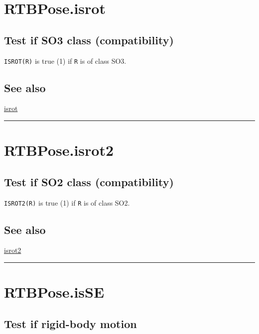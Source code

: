 \hypertarget{RTBPose.isrot}{\section*{RTBPose.isrot}}
\subsection*{Test if SO3 class (compatibility)}


\texttt{ISROT(R)} is true (1) if \texttt{R} is of class SO3.


\subsection*{See also}


\hyperlink{isrot}{\color{blue} isrot}

\vspace{1.5ex}\hrule

\hypertarget{RTBPose.isrot2}{\section*{RTBPose.isrot2}}
\subsection*{Test if SO2 class (compatibility)}


\texttt{ISROT2(R)} is true (1) if \texttt{R} is of class SO2.


\subsection*{See also}


\hyperlink{isrot2}{\color{blue} isrot2}

\vspace{1.5ex}\hrule

\hypertarget{RTBPose.isSE}{\section*{RTBPose.isSE}}
\subsection*{Test if rigid-body motion}


